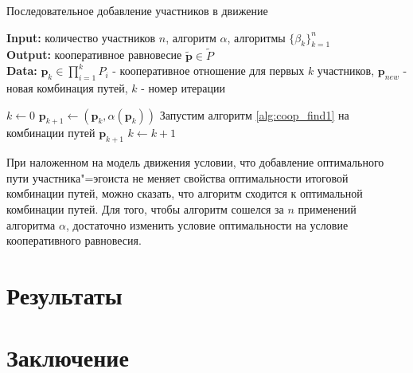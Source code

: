 \documentclass[12pt, a4paper]{article}
\begin{document}
\begin{algorithm}[H]
	\caption{Последовательное добавление участников в движение}
	\label{alg:coop_find2}
	{\bf {Input:}} количество участников $n$, алгоритм $\alpha$, алгоритмы $\{\beta_k\}_{k = 1}^n$\\
	{\bf {Output:}} кооперативное равновесие $\widetilde{\textbf{p}} \in \widetilde{P}$\\
	{\bf {Data:}} $\textbf{p}_{k} \in \prod\limits_{i = 1}^kP_i$ - кооперативное отношение для первых $k$ участников, $\textbf{p}_{new}$ - новая комбинация путей, $k$ - номер итерации
	\begin{algorithmic}[1]
		\State $k \gets 0$
		\State $\textbf{p}_{k + 1} \gets (\textbf{p}_{k}, \alpha (\textbf{p}_{k}))$
		\State Запустим алгоритм \ref {alg:coop_find1} на комбинации путей $\textbf{p}_{k + 1}$
		\State $k \gets k + 1$
		\EndWhile
	\end{algorithmic}
\end{algorithm}

При наложенном на модель движения условии, что добавление оптимального пути участника"=эгоиста не меняет свойства оптимальности итоговой комбинации путей, можно сказать, что алгоритм сходится к оптимальной комбинации путей. Для того, чтобы алгоритм сошелся за $n$ применений алгоритма $\alpha$, достаточно изменить условие оптимальности на условие кооперативного равновесия.


\newpage
\section{Результаты}

\newpage
\section{Заключение}
\end{document}
